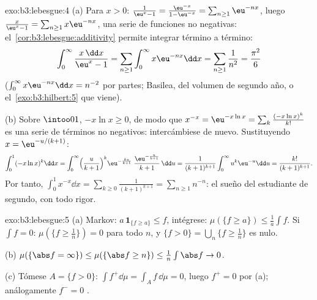 \begin{solution}{exo:b3:lebesgue:4}
(a) Para $x > 0$: $\frac1{\eu^x - 1} = \frac{\eu^{-x}}{1 -
\eu^{-x}} = \sum_{n\geq1}\eu^{-nx}$, luego $\frac{x}{\eu^x - 1} =
\sum_{n\geq1}x\eu^{-nx}$, una serie de
funciones  no negativas:
el~\cref{cor:b3:lebesgue:additivity} permite integrar término a término:
\[
\int_0^\infty\frac{x\,\dd x}{\eu^x - 1}
= \sum_{n\geq1}\int_0^\infty x\eu^{-nx}\dd x
= \sum_{n\geq1}\frac1{n^2} = \frac{\pi^2}6
\]
($\int_0^\infty x\eu^{-nx}\dd x = n^{-2}$ por partes; Basilea, del
volumen de segundo año, o el~\cref{exo:b3:hilbert:5} que viene).

(b) Sobre $\intoo01$, $-x\ln x \geq 0$, de modo que $x^{-x} =
\eu^{-x\ln x} = \sum_k\frac{(-x\ln x)^k}{k!}$ es una serie de términos
no negativos: intercámbiese de nuevo. Sustituyendo $x =
\eu^{-u/(k+1)}$:
\[
\int_0^1(-x\ln x)^k\dd x
= \int_0^\infty\Bigl(\frac{u}{k+1}\Bigr)^{k}
\eu^{-\frac{ku}{k+1}}\;\frac{\eu^{-\frac u{k+1}}}{k+1}\,\dd u
= \frac{1}{(k+1)^{k+1}}\int_0^\infty u^k\eu^{-u}\dd u
= \frac{k!}{(k+1)^{k+1}} .
\]
Por tanto, $\int_0^1x^{-x}\dd x = \sum_{k\geq0}\frac{1}{(k+1)^{k+1}}
= \sum_{n\geq1}n^{-n}$: el sueño del estudiante de segundo, con todo
rigor.
\end{solution}

\begin{solution}{exo:b3:lebesgue:5}
(a) Markov: $a\,\mathbf 1_{\{f \geq a\}} \leq f$, intégrese:
$\mu(\{f \geq a\}) \leq \frac1a\int f$. Si $\int f = 0$:
$\mu(\{f \geq \frac1n\}) = 0$ para todo $n$, y $\{f > 0\} =
\bigcup_n\{f \geq \frac1n\}$ es nulo.

(b) $\mu(\{\abs f = \infty\}) \leq \mu(\{\abs f \geq n\}) \leq
\frac1n\int\abs f \to 0$.

(c) Tómese $A = \{f > 0\}$: $\int f^+\dd\mu = \int_Af\,\dd\mu =
0$, luego $f^+ = 0$  por (a); análogamente $f^- = 0$
.
\end{solution}

